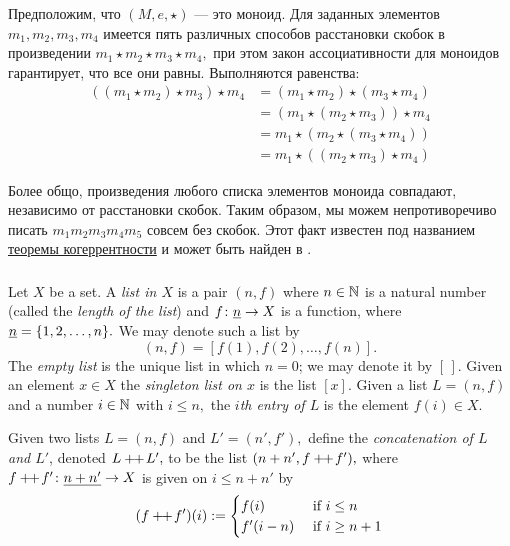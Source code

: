 \documentclass[../main/CT4S-EN-RU]{subfiles}
\begin{document}
\begin{exampleRUS}
Предположим, что $(M,e,\star)$ — это моноид. Для заданных элементов $m_1,m_2,m_3,m_4$ имеется пять различных способов расстановки скобок в произведении $m_1\star m_2\star m_3\star m_4,$ при этом закон ассоциативности для моноидов гарантирует, что все они равны. Выполняются равенства:
\begin{align*}
((m_1\star m_2)\star m_3)\star m_4&=(m_1\star m_2)\star (m_3\star m_4)\\
&=(m_1\star(m_2\star m_3))\star m_4\\
&=m_1\star(m_2\star (m_3\star m_4))\\
&=m_1\star((m_2\star m_3)\star m_4)
\end{align*}

Более общо, произведения любого списка элементов моноида совпадают, независимо от расстановки скобок. Таким образом, мы можем непротиворечиво писать $m_1m_2m_3m_4m_5$ совсем без скобок. Этот факт известен под названием \href{http://en.wikipedia.org/wiki/Coherence_theorem}{\text теоремы когеррентности} и может быть найден в \cite{Mac}.
\end{exampleRUS}


\subsubsection{}\label{sec:free monoid}

\begin{definitionENG}\label{def:list}
Let $X$ be a set. A {\em list in $X$} is a pair $(n,f)$ where $n\in{\mathbb N}$ is a natural number (called the {\em length of the list}) and $f\colon\underline{n}\rightarrow X$ is a function, where $\underline{n}=\{1,2,\ldots,n\}.$ We may denote such a list by
$$(n,f)=[f(1),f(2),\ldots,f(n)].$$
The {\em empty list} is the unique list in which $n=0$; we may denote it by $[\,].$ Given an element $x\in X$ the {\em singleton list on $x$} is the list $[x].$ Given a list $L=(n,f)$ and a number $i\in{\mathbb N}$ with $i\leq n,$ the {\em $i$th entry of $L$} is the element $f(i)\in X.$ 

Given two lists $L=(n,f)$ and $L'=(n',f'),$ define the {\em concatenation of $L$ and $L'$}, denoted $L+\!\!+\hspace{1pt} L',$ to be the list $(n+n',f+\!\!+\hspace{1pt} f'),$ where $f+\!\!+\hspace{1pt} f'\colon \underline{n+n'}\rightarrow X$ is given on $i\leq n+n'$ by
$$(f+\!\!+\hspace{1pt} f')(i):=
\begin{cases}
f(i)&\textnormal{ if }i\leq n\\
f'(i-n)&\textnormal{ if }i\geq n+1
\end{cases}
$$
\end{definitionENG}
\end{document}

